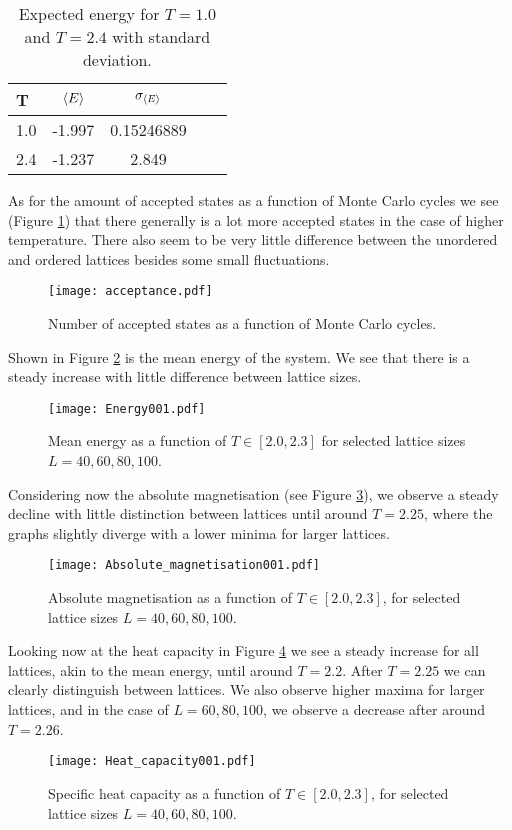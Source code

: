 \begin{table}[htbp]
	\centering
	\begin{tabular}{l|cccc}
		\textbf{T} & $\expval{E}$ & $\sigma_{\expval{E}}$  \\
		\midrule
		
		1.0 & -1.997 & 0.15246889 \\
		2.4 & -1.237 & 2.849  \\
	\end{tabular}
	\caption{Expected energy for $T=1.0$ and $T=2.4$ with standard deviation.}
	\label{table:energystd}
\end{table}


As for the amount of accepted states as a function of Monte Carlo cycles we see (Figure \ref{fig:acceptance}) that there generally is a lot more accepted states in the case of higher temperature. There also seem to be very little difference between the unordered and ordered lattices besides some small fluctuations.
\begin{figure}[htbp]
	\centering
	\texttt{[image: acceptance.pdf]}
	\caption{Number of accepted states as a function of Monte Carlo cycles.}
	\label{fig:acceptance}
\end{figure}

Shown in Figure \ref{fig:energy001} is the mean energy of the system. We see that there is a steady increase with little difference between lattice sizes.
\begin{figure}[htbp]
	\centering
	\texttt{[image: Energy001.pdf]}
	\caption{Mean energy as a function of $T \in[2.0, 2.3]$ for selected lattice sizes $L = 40, 60, 80, 100$.}
	\label{fig:energy001}
\end{figure}

Considering now the absolute magnetisation (see Figure \ref{fig:absmag}), we observe a steady decline with little distinction between lattices until around $T=2.25$, where the graphs slightly diverge with a lower minima for larger lattices.
\begin{figure}[htbp]
	\centering
	\texttt{[image: Absolute\_magnetisation001.pdf]}
	\caption{Absolute magnetisation as a function of $T \in[2.0, 2.3]$, for selected lattice sizes $L = 40, 60, 80, 100$.}
	\label{fig:absmag}
\end{figure}

Looking now at the heat capacity in Figure \ref{fig:heatcap001} we see a steady increase for all lattices, akin to the mean energy, until around $T=2.2$. After $T=2.25$ we can clearly distinguish between lattices. We also observe higher maxima for larger lattices, and in the case of $L=60, 80, 100$, we observe a decrease after around $T=2.26$.
\begin{figure}[htbp]
	\centering
	\texttt{[image: Heat\_capacity001.pdf]}
	\caption{Specific heat capacity as a function of $T \in[2.0, 2.3]$, for selected lattice sizes $L = 40, 60, 80, 100$.}
	\label{fig:heatcap001}
\end{figure}

